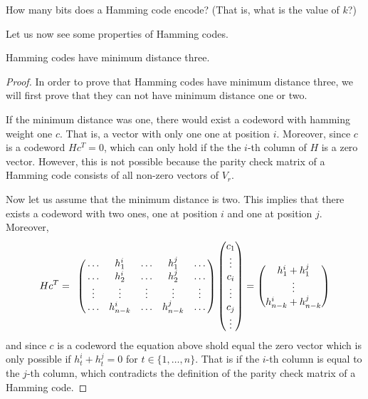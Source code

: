 \begin{exercise}
How many bits does a Hamming code encode? (That is, what is the value of $k$?)
\end{exercise}
Let us now see some properties of Hamming codes. 
\begin{lemma}
Hamming codes have minimum distance three.
\end{lemma}
\begin{proof}
In order to prove that Hamming codes have minimum distance three, we will first prove that they can not have minimum distance one or two.

If the minimum distance was one, there would exist a codeword with hamming weight one $c$. That is, a vector with only one one at position $i$. Moreover, since $c$ is a codeword $Hc^T=0$, which can only hold if the the $i$-th column of $H$ is a zero vector. However, this is not possible because the parity check matrix of a Hamming code consists of all non-zero vectors of $V_r$.

Now let us assume that the minimum distance is two. This implies that there exists a codeword with two ones, one at position $i$ and one at position $j$. Moreover, 
\begin{equation}
Hc^T=
\bordermatrix{& &        & &        &\cr
                &\ldots &h^i_1    &\ldots &h^j_1    &\ldots\cr
                &\ldots &h^i_2    &\ldots &h^j_2    &\ldots\cr
                &\vdots &\vdots   &\vdots &\vdots   &\vdots\cr
                &\ldots &h^i_{n-k}&\ldots &h^j_{n-k}&\ldots} \begin{pmatrix}c_1\\\vdots\\c_i\\\vdots\\c_j\\\vdots\end{pmatrix}=\begin{pmatrix}h^i_1+h^j_1\\\vdots\\h^i_{n-k}+h^j_{n-k}\end{pmatrix}
\end{equation}
and since $c$ is a codeword the equation above shold equal the zero vector which is only possible if $h^i_t+h^j_t=0$ for $t\in\{1,\ldots,n\}$. That is if the $i$-th column is equal to the $j$-th column, which contradicts the definition of the parity check matrix of a Hamming code.


\end{proof}
